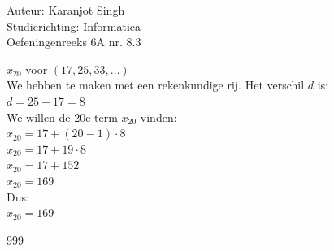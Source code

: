 \documentclass[a4paper]{article}
\begin{document}
\noindent \large Auteur: Karanjot Singh \\
\noindent \large Studierichting: Informatica \\
\noindent \large Oefeningenreeks 6A nr. 8.3 \\

\normalsize

$x_{20}$ voor $(17, 25, 33, \ldots)$ \\

We hebben te maken met een rekenkundige rij. Het verschil $d$ is: \\

$d = 25 - 17 = 8$ \\

We willen de 20e term $x_{20}$ vinden: \\

$x_{20} = 17 + (20 - 1) \cdot 8$ \\

$x_{20} = 17 + 19 \cdot 8$ \\

$x_{20} = 17 + 152$ \\

$x_{20} = 169$ \\

Dus: \\

$x_{20} = 169$ \\

\begin{thebibliography}{999}
\end{thebibliography}
\end{document}
